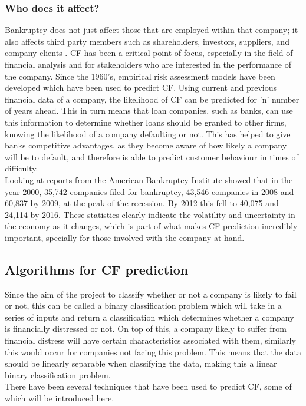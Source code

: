 \documentclass[11pt]{article}
\begin{document}
\subsubsection{Who does it affect?}
Bankruptcy does not just affect those that are employed within that company; it also affects third party members such as shareholders, investors, suppliers, and company clients . CF has been a critical point of focus, especially in the field of financial analysis and for stakeholders who are interested in the performance of the company. Since the 1960's, empirical risk assessment models have been developed which have been used to predict CF. Using current and previous financial data of a company, the likelihood of CF can be predicted for 'n' number of years ahead. This in turn means that loan companies, such as banks, can use this information to determine whether loans should be granted to other firms, knowing the likelihood of a company defaulting or not. This has helped to give banks competitive advantages, as they become aware of how likely a company will be to default, and therefore is able to predict customer behaviour in times of difficulty.\\
Looking at reports from the American Bankruptcy Institute showed that in the year 2000, 35,742 companies filed for bankruptcy, 43,546 companies in 2008 and 60,837 by 2009, at the peak of the recession. By 2012 this fell to 40,075 and 24,114 by 2016. These statistics clearly indicate the volatility and uncertainty in the economy as it changes, which is part of what makes CF prediction incredibly important, specially for those involved with the company at hand.

\subsection{Algorithms for CF prediction}
Since the aim of the project to classify whether or not a company is likely to fail or not, this can be called a binary classification problem which will take in a series of inputs and return a classification which determines whether a company is financially distressed or not. On top of this, a company likely to suffer from financial distress will have certain characteristics associated with them, similarly this would occur for companies not facing this problem. This means that the data should be linearly separable when classifying the data, making this a linear binary classification problem. \\
There have been several techniques that have been used to predict CF, some of which will be introduced here. 
\end{document}

